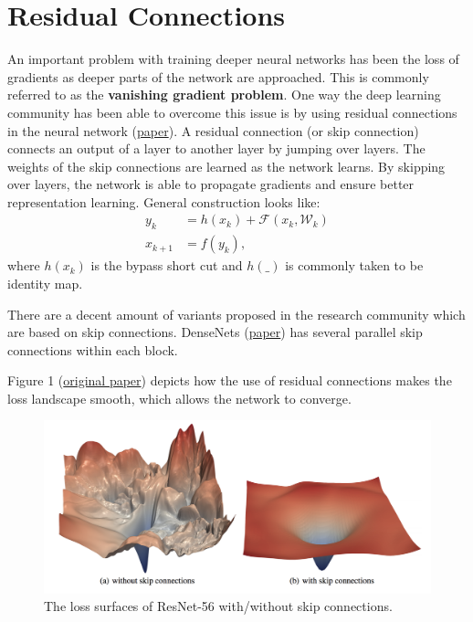 \section{Residual Connections}
An important problem with training deeper neural networks has been the loss of gradients as deeper parts of the network are approached.
This is commonly referred to as the \textbf{vanishing gradient problem}.
One way the deep learning community has been able to overcome this issue is by using residual connections in the neural network (\href{https://arxiv.org/abs/1512.03385}{paper}).
A residual connection (or skip connection) connects an output of a layer to another layer by jumping over layers.
The weights of the skip connections are learned as the network learns.
By skipping over layers, the network is able to propagate gradients and ensure better representation learning.
General construction looks like:
$$
\begin{aligned}
y_k & = h(x_k) +\mathcal{F}(x_k, \mathcal{W}_k)\\
x_{k+1} & = f(y_k),
\end{aligned}
$$
where $h(x_k)$ is the bypass short cut and $h(\_)$ is commonly taken to be identity map.

There are a decent amount of variants proposed in the research community which are based on skip connections.
DenseNets (\href{https://arxiv.org/abs/1608.06993}{paper}) has several parallel skip connections within each block.

Figure 1 (\href{https://arxiv.org/pdf/1712.09913.pdf}{original paper}) depicts how the use of residual connections makes the loss landscape smooth, which allows the network to converge.

\begin{figure}
    \centering
    \includegraphics[width=\textwidth]{figs/loss.png}
    \caption{ The loss surfaces of ResNet-56 with/without skip connections.}
    \label{fig:my_label0}
\end{figure}

